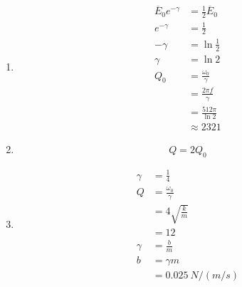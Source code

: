 \documentclass{article}
\begin{document}
\begin{enumerate}
  \item

        \begin{align*}
          \overline{E}_0 e^{-\gamma} & = \frac{1}{2} \overline{E}_0 \\
          e^{-\gamma}                & = \frac{1}{2}                \\
          -\gamma                    & = \ln \frac{1}{2}            \\
          \gamma                     & = \ln 2                      \\
          Q_0                        & = \frac{\omega_0}{\gamma}    \\
                                     & = \frac{2 \pi f}{\gamma}     \\
                                     & = \frac{512 \pi}{\ln 2}      \\
                                     & \approx 2321
        \end{align*}

  \item \[Q = 2 Q_0\]

  \item

        \begin{align*}
          \gamma & = \frac{1}{4}             \\
          Q      & = \frac{\omega_0}{\gamma} \\
                 & = 4 \sqrt{\frac{k}{m}}    \\
                 & = 12                      \\
          \gamma & = \frac{b}{m}             \\
          b      & = \gamma m                \\
                 & = \qty{0.025}{N/(m/s)}
        \end{align*}
\end{enumerate}

\subsection{}
\end{document}

